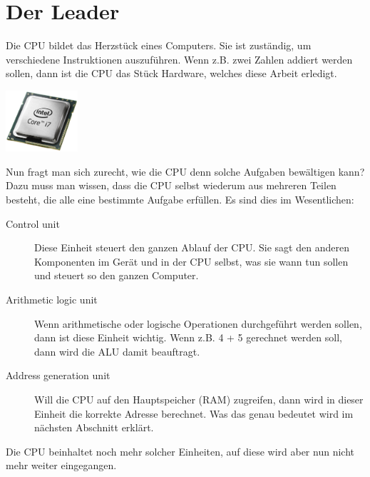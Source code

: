 \newpage


\section{Der Leader}
Die \gls{CPU} bildet das Herzstück eines Computers. Sie ist zuständig, um verschiedene Instruktionen auszuführen. Wenn
z.B. zwei Zahlen addiert werden sollen, dann ist die CPU das Stück Hardware, welches diese Arbeit erledigt.\par
\begin{minipage}{\linewidth}
    \centering
    \includegraphics[width=0.2\textwidth]{../common/chapter_02/resources/01_cpu_intel.png}
\end{minipage}
Nun fragt man sich zurecht, wie die CPU denn solche Aufgaben bewältigen kann? Dazu muss man wissen, dass die CPU
selbst wiederum aus mehreren Teilen besteht, die alle eine bestimmte Aufgabe erfüllen. Es sind dies im Wesentlichen:
\begin{description}
    \item[Control unit] Diese Einheit steuert den ganzen Ablauf der CPU. Sie sagt den anderen Komponenten im Gerät und
    in der CPU selbst, was sie wann tun sollen und steuert so den ganzen Computer.\cite{wikipedia:cu}
    \item[Arithmetic logic unit] Wenn arithmetische oder logische Operationen durchgeführt werden sollen, dann ist diese
    Einheit wichtig. Wenn z.B. 4 + 5 gerechnet werden soll, dann wird die \gls{ALU} damit beauftragt.\cite{wikipedia:alu}
    \item[Address generation unit] Will die CPU auf den Hauptspeicher (RAM) zugreifen, dann wird in dieser Einheit die korrekte
    Adresse berechnet. Was das genau bedeutet wird im nächsten Abschnitt erklärt.\cite{wikipedia:agu}
\end{description}
Die CPU beinhaltet noch mehr solcher Einheiten, auf diese wird aber nun nicht mehr weiter eingegangen.

